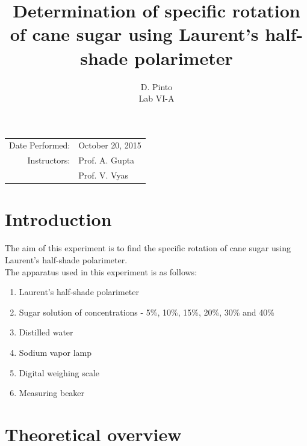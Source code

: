 \documentclass{dkpinto-report}
\title{\bfseries Determination of specific rotation of cane sugar using Laurent's half-shade polarimeter}
\author{D. Pinto \\ Lab VI-A}
\date{\vspace{-5ex}}
\begin{document}
\begin{titlepage}
\maketitle

\begin{center}
\begin{tabular}{r l} %
Date Performed: & October 20, 2015 \\ %
Instructors: & Prof. A. Gupta \\  %
			 & Prof. V. Vyas
\end{tabular}
\end{center}

\vfill

\tableofcontents  %
\thispagestyle{empty}  %

\end{titlepage}



\section{Introduction} 
The aim of this experiment is to find the specific rotation of cane sugar using Laurent's half-shade polarimeter.\\
The apparatus used in this experiment is as follows:

\begin{enumerate}  %
\itemsep0em  %
\item Laurent's half-shade polarimeter
\item Sugar solution of concentrations - 5\%, 10\%, 15\%, 20\%, 30\% and 40\% 
\item Distilled water
\item Sodium vapor lamp
\item Digital weighing scale
\item Measuring beaker   
\end{enumerate}



\section{Theoretical overview}
\end{document}
